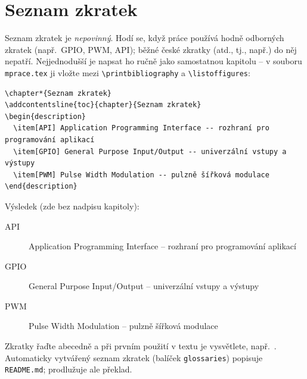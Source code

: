 
\section{Seznam zkratek}

Seznam zkratek je \emph{nepovinný}. Hodí se, když práce používá hodně odborných zkratek
(např.\ GPIO, PWM, API); běžné české zkratky (atd., tj., např.) do něj nepatří.
Nejjednodušší je napsat ho ručně jako samostatnou kapitolu -- v souboru \texttt{mprace.tex}
ji vložte mezi \verb|\printbibliography| a \verb|\listoffigures|:

{\footnotesize
\begin{verbatim}
\chapter*{Seznam zkratek}
\addcontentsline{toc}{chapter}{Seznam zkratek}
\begin{description}
  \item[API] Application Programming Interface -- rozhraní pro programování aplikací
  \item[GPIO] General Purpose Input/Output -- univerzální vstupy a výstupy
  \item[PWM] Pulse Width Modulation -- pulzně šířková modulace
\end{description}
\end{verbatim}}

Výsledek (zde bez nadpisu kapitoly):
\begin{description}
	\item[API] Application Programming Interface -- rozhraní pro programování aplikací
	\item[GPIO] General Purpose Input/Output -- univerzální vstupy a výstupy
	\item[PWM] Pulse Width Modulation -- pulzně šířková modulace
\end{description}

Zkratky řaďte abecedně a při prvním použití v textu je vysvětlete,
např.\ .
Automaticky vytvářený seznam zkratek (balíček \texttt{glossaries}) popisuje \texttt{README.md};
prodlužuje ale překlad.
